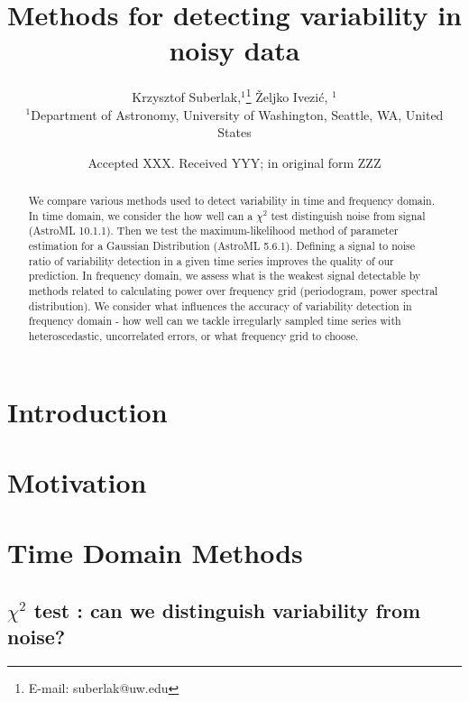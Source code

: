 \documentclass[fleqn,usenatbib]{mnras}  %
\title[Variability detection]{Methods for detecting variability in noisy data}
\author[K. Suberlak et al.]{
Krzysztof Suberlak,$^{1}$\thanks{E-mail: suberlak@uw.edu}
\v{Z}eljko Ivezi\'c, $^{1}$
\\
$^{1}$Department of Astronomy, University of Washington, Seattle, WA, United States\\
}
\date{Accepted XXX. Received YYY; in original form ZZZ}
\begin{document}
\label{firstpage}
\pagerange{\pageref{firstpage}--\pageref{lastpage}}
\maketitle

\begin{abstract}

We compare various methods used to detect variability in time and frequency domain. In time domain, we consider the how well can a  $\chi^{2}$ test distinguish noise from signal (AstroML 10.1.1). Then we test the maximum-likelihood method of parameter estimation for a Gaussian Distribution (AstroML 5.6.1). Defining a signal to noise ratio of variability detection in a given time series improves the quality of our prediction.  
In frequency domain, we assess what is the weakest signal detectable by methods related to calculating power over frequency grid (periodogram, power spectral distribution). We consider what influences the accuracy of variability detection in frequency domain - how well can we tackle irregularly sampled time series with  heteroscedastic, uncorrelated errors, or what frequency grid to choose.  

\end{abstract}




\section{Introduction} 

\section{Motivation}

\section{Time Domain Methods}



%
%

\subsection{ $\chi^{2}$ test : can we distinguish variability from noise?}
\label{sec:chi2test}
\end{document}
